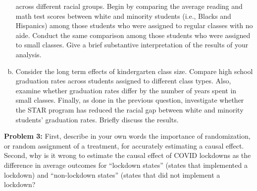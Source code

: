 \documentclass[11pt]{article}
\begin{document}
\begin{enumerate}[a.]
  across different racial groups.  Begin by comparing the average
  reading and math test scores between white and minority students
  (i.e., Blacks and Hispanics) among those students who were assigned
  to regular classes with no aide.  Conduct the same comparison among
  those students who were assigned to small classes.  Give a brief
  substantive interpretation of the results of your analysis.
  \item Consider the long term effects of kindergarten class size.
  Compare high school graduation rates across students assigned to
  different class types.  Also, examine whether graduation rates
  differ by the number of years spent in small classes.  Finally, as
  done in the previous question, investigate whether the STAR program
  has reduced the racial gap between white and minority students'
  graduation rates.  Briefly discuss the results.
\end{enumerate}	

\vspace{7mm}
\noindent \textbf{Problem 3:} First, describe in your own words the importance of randomization, or random assignment of a treatment, for accurately estimating a causal effect. Second, why is it wrong to estimate the causal effect of COVID lockdowns as the difference in average outcomes for ``lockdown states'' (states that implemented a lockdown) and ``non-lockdown states'' (states that did not implement a lockdown?
\end{document}
